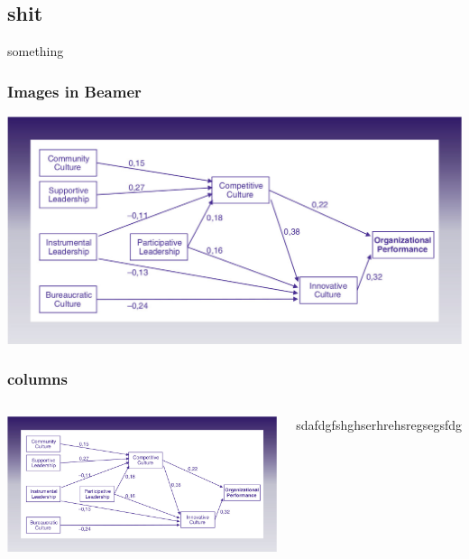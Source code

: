 \subsection{shit}
something
\begin{frame}
\frametitle{Images in Beamer}

\includegraphics[scale=.25]{"./image/OB/Ogbonna & Harris.jpg"}

\end{frame}
\begin{frame}
\frametitle{columns}

\begin{columns}

\includegraphics[scale=.1]{"./image/OB/Ogbonna & Harris.jpg"}


sdafdgfshghserhrehsregsegsfdg

\end{columns}

\end{frame}
